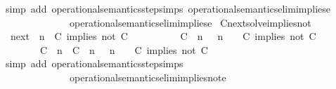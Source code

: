 \begin{isabellebody}
%
\isadelimproof
%
\endisadelimproof
%
\isatagproof
{}\isamarkupfalse%
\ {\isacharparenleft}simp\ add{\isacharcolon}\ operational{\isacharunderscore}semantics{\isacharunderscore}step{\isachardot}simps\ operational{\isacharunderscore}semantics{\isacharunderscore}elim{\isachardot}implies{\isacharunderscore}e{}\isanewline
\ \ \ \ \ \ \ \ \ \ \ \ \ \ operational{\isacharunderscore}semantics{\isacharunderscore}elim{\isachardot}implies{\isacharunderscore}e{}{\isacharparenright}%
\endisatagproof
{\isafoldproof}%
%
\isadelimproof
\isanewline
%
\endisadelimproof
\isanewline
{}\isamarkupfalse%
\ Cnext{\isacharunderscore}solve{\isacharunderscore}implies{\isacharunderscore}not{\isacharcolon}\isanewline
\ \ {\isacartoucheopen}{\isacharparenleft}{\isasymC}\isactrlsub n\isactrlsub e\isactrlsub x\isactrlsub t\ {\isacharparenleft}{\isasymGamma}{\isacharcomma}\ n\ {\isasymturnstile}\ {\isacharparenleft}{\isacharparenleft}C\ implies\ not\ C\ {\isacharhash}\ {\isasymPsi}{\isacharparenright}\ {\isasymtriangleright}\ {\isasymPhi}{\isacharparenright}{\isacharparenright}\isanewline
\ \ \ \ {\isasymsupseteq}\ {\isacharbraceleft}\ {\isacharparenleft}{\isacharparenleft}C\ {\isasymnot}{\isasymUp}\ n{\isacharparenright}\ {\isacharhash}\ {\isasymGamma}{\isacharparenright}{\isacharcomma}\ n\ {\isasymturnstile}\ {\isasymPsi}\ {\isasymtriangleright}\ {\isacharparenleft}{\isacharparenleft}C\ implies\ not\ C\ {\isacharhash}\ {\isasymPhi}{\isacharparenright}{\isacharcomma}\isanewline
\ \ \ \ \ \ \ \ {\isacharparenleft}{\isacharparenleft}C\ {\isasymUp}\ n{\isacharparenright}\ {\isacharhash}\ {\isacharparenleft}C\ {\isasymnot}{\isasymUp}\ n{\isacharparenright}\ {\isacharhash}\ {\isasymGamma}{\isacharparenright}{\isacharcomma}\ n\ {\isasymturnstile}\ {\isasymPsi}\ {\isasymtriangleright}\ {\isacharparenleft}{\isacharparenleft}C\ implies\ not\ C\ {\isacharhash}\ {\isasymPhi}{\isacharparenright}\ {\isacharbraceright}{\isacartoucheclose}\isanewline
%
\isadelimproof
%
\endisadelimproof
%
\isatagproof
{}\isamarkupfalse%
\ {\isacharparenleft}simp\ add{\isacharcolon}\ operational{\isacharunderscore}semantics{\isacharunderscore}step{\isachardot}simps\isanewline
\ \ \ \ \ \ \ \ \ \ \ \ \ \ operational{\isacharunderscore}semantics{\isacharunderscore}elim{\isachardot}implies{\isacharunderscore}not{\isacharunderscore}e{}\isanewline

\end{isabellebody}

